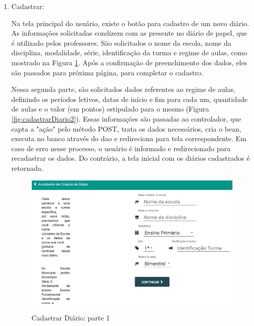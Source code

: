 \begin{enumerate}
	\item Cadastrar:
	
	Na tela principal do usuário, existe o botão para cadastro de um novo diário. As informações solicitadas condizem com as presente no diário de papel, que é utilizado pelos professores. São solicitados o nome da escola, nome da disciplina, modalidade, série, identificação da turma e regime de aulas, como mostrado na Figura \ref{fig:cadastrarDiario}. Após a confirmação de preenchimento dos dados, eles são passados para próxima página, para completar o cadastro.
	
	 Nessa segunda parte, são solicitados dados referentes ao regime de aulas, definindo os períodos letivos, datas de início e fim para cada um, quantidade de aulas e o valor (em pontos) estipulado para o mesmo (Figura \ref{fig:cadastrarDiario2}). Essas informações são passadas ao controlador, que capta a "ação" pelo método POST, trata os dados necessários, cria o bean, executa no banco através do dao e redireciona para tela correspondente. Em caso de erro nesse processo, o usuário é informado e redirecionado para recadastrar os dados. Do contrário, a tela inicial com os diários cadastrados é retornada.
	
	
	
	\begin{figure}[!htb]
		\centering
		\caption{Cadastrar Diário: parte 1} %
		\includegraphics[scale=0.4]{cadastrarDiario}\\  %
		{\small } %
		\label{fig:cadastrarDiario} %
	\end{figure}
	

\end{enumerate}
